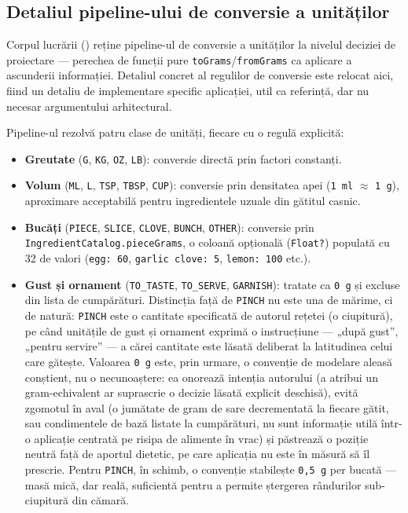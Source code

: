 \subsection{Detaliul pipeline-ului de conversie a unităților}\label{anexa:grams-detail}

Corpul lucrării () reține pipeline-ul de conversie a unităților la nivelul deciziei de proiectare --- perechea de funcții pure \texttt{toGrams}/\texttt{fromGrams} ca aplicare a ascunderii informației. Detaliul concret al regulilor de conversie este relocat aici, fiind un detaliu de implementare specific aplicației, util ca referință, dar nu necesar argumentului arhitectural.

Pipeline-ul rezolvă patru clase de unități, fiecare cu o regulă explicită:

\begin{itemize}
  \item \textbf{Greutate} (\texttt{G}, \texttt{KG}, \texttt{OZ}, \texttt{LB}): conversie directă prin factori constanți.
  \item \textbf{Volum} (\texttt{ML}, \texttt{L}, \texttt{TSP}, \texttt{TBSP}, \texttt{CUP}): conversie prin densitatea apei (\texttt{1 ml} \(\approx\) \texttt{1 g}), aproximare acceptabilă pentru ingredientele uzuale din gătitul casnic.
  \item \textbf{Bucăți} (\texttt{PIECE}, \texttt{SLICE}, \texttt{CLOVE}, \texttt{BUNCH}, \texttt{OTHER}): conversie prin \texttt{IngredientCatalog.\allowbreak pieceGrams}, o coloană opțională (\texttt{Float?}) populată cu 32 de valori (\texttt{egg: 60}, \texttt{garlic clove: 5}, \texttt{lemon: 100} etc.).
  \item \textbf{Gust și ornament} (\texttt{TO\_TASTE}, \texttt{TO\_SERVE}, \texttt{GARNISH}): tratate ca \texttt{0 g} și excluse din lista de cumpărături. Distincția față de \texttt{PINCH} nu este una de mărime, ci de natură: \texttt{PINCH} este o cantitate specificată de autorul rețetei (o ciupitură), pe când unitățile de gust și ornament exprimă o instrucțiune --- „după gust”, „pentru servire” --- a cărei cantitate este lăsată deliberat la latitudinea celui care gătește. Valoarea \texttt{0 g} este, prin urmare, o convenție de modelare aleasă conștient, nu o necunoaștere: ea onorează intenția autorului (a atribui un gram-echivalent ar suprascrie o decizie lăsată explicit deschisă), evită zgomotul în aval (o jumătate de gram de sare decrementată la fiecare gătit, sau condimentele de bază listate la cumpărături, nu sunt informație utilă într-o aplicație centrată pe risipa de alimente în vrac) și păstrează o poziție neutră față de aportul dietetic, pe care aplicația nu este în măsură să îl prescrie. Pentru \texttt{PINCH}, în schimb, o convenție stabilește \texttt{0,5 g} per bucată --- masă mică, dar reală, suficientă pentru a permite ștergerea rândurilor sub-ciupitură din cămară.
\end{itemize}

